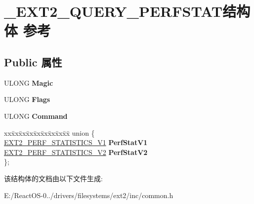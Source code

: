 \hypertarget{struct___e_x_t2___q_u_e_r_y___p_e_r_f_s_t_a_t}{}\section{\+\_\+\+E\+X\+T2\+\_\+\+Q\+U\+E\+R\+Y\+\_\+\+P\+E\+R\+F\+S\+T\+A\+T结构体 参考}
\label{struct___e_x_t2___q_u_e_r_y___p_e_r_f_s_t_a_t}
\subsection*{Public 属性}
\begin{DoxyCompactItemize}
\item 
\mbox{\label{struct___e_x_t2___q_u_e_r_y___p_e_r_f_s_t_a_t_a5741045746300aa6b6847ac61a4bbcf5}} 
U\+L\+O\+NG {\bfseries Magic}
\item 
\mbox{\label{struct___e_x_t2___q_u_e_r_y___p_e_r_f_s_t_a_t_a51cca5068762dff7918dba7c4a1b8b6f}} 
U\+L\+O\+NG {\bfseries Flags}
\item 
\mbox{\label{struct___e_x_t2___q_u_e_r_y___p_e_r_f_s_t_a_t_afb322bf73dbf29046346fe44aa5d731d}} 
U\+L\+O\+NG {\bfseries Command}
\item 
\mbox{\label{struct___e_x_t2___q_u_e_r_y___p_e_r_f_s_t_a_t_ab830195ec96cec9a84df1890d91798c3}} 
\begin{tabbing}
xx\=xx\=xx\=xx\=xx\=xx\=xx\=xx\=xx\=\kill
union \{\\
\>\hyperlink{struct___e_x_t2___p_e_r_f___s_t_a_t_i_s_t_i_c_s___v1}{EXT2\_PERF\_STATISTICS\_V1} {\bfseries PerfStatV1}\\
\>\hyperlink{struct___e_x_t2___p_e_r_f___s_t_a_t_i_s_t_i_c_s___v2}{EXT2\_PERF\_STATISTICS\_V2} {\bfseries PerfStatV2}\\
\}; \\

\end{tabbing}\end{DoxyCompactItemize}


该结构体的文档由以下文件生成\+:\begin{DoxyCompactItemize}
\item 
E\+:/\+React\+O\+S-\/0../drivers/filesystems/ext2/inc/common.\+h\end{DoxyCompactItemize}

